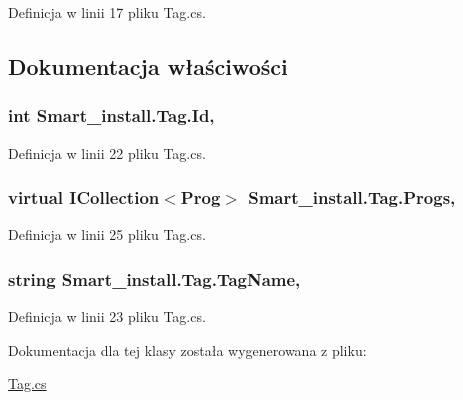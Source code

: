 Definicja w linii 17 pliku Tag.\+cs.



\subsection{Dokumentacja właściwości}
\hypertarget{class_smart__install_1_1_tag_a02e240da6d50c298b6e5927646429bde}{
\subsubsection[{Id}]{\setlength{\rightskip}{0pt plus 5cm}int Smart\+\_\+install.\+Tag.\+Id\hspace{0.3cm}{\ttfamily [get]}, {\ttfamily [set]}}}\label{class_smart__install_1_1_tag_a02e240da6d50c298b6e5927646429bde}


Definicja w linii 22 pliku Tag.\+cs.

\hypertarget{class_smart__install_1_1_tag_a48e4b56a5f0c6f41d53948eefb472626}{
\subsubsection[{Progs}]{\setlength{\rightskip}{0pt plus 5cm}virtual I\+Collection$<${\bf Prog}$>$ Smart\+\_\+install.\+Tag.\+Progs\hspace{0.3cm}{\ttfamily [get]}, {\ttfamily [set]}}}\label{class_smart__install_1_1_tag_a48e4b56a5f0c6f41d53948eefb472626}


Definicja w linii 25 pliku Tag.\+cs.

\hypertarget{class_smart__install_1_1_tag_a6f6503d214a4359a0abd4ec80fc2bebf}{
\subsubsection[{Tag\+Name}]{\setlength{\rightskip}{0pt plus 5cm}string Smart\+\_\+install.\+Tag.\+Tag\+Name\hspace{0.3cm}{\ttfamily [get]}, {\ttfamily [set]}}}\label{class_smart__install_1_1_tag_a6f6503d214a4359a0abd4ec80fc2bebf}


Definicja w linii 23 pliku Tag.\+cs.



Dokumentacja dla tej klasy została wygenerowana z pliku\+:\begin{DoxyCompactItemize}
\item 
\hyperlink{_tag_8cs}{Tag.\+cs}\end{DoxyCompactItemize}
